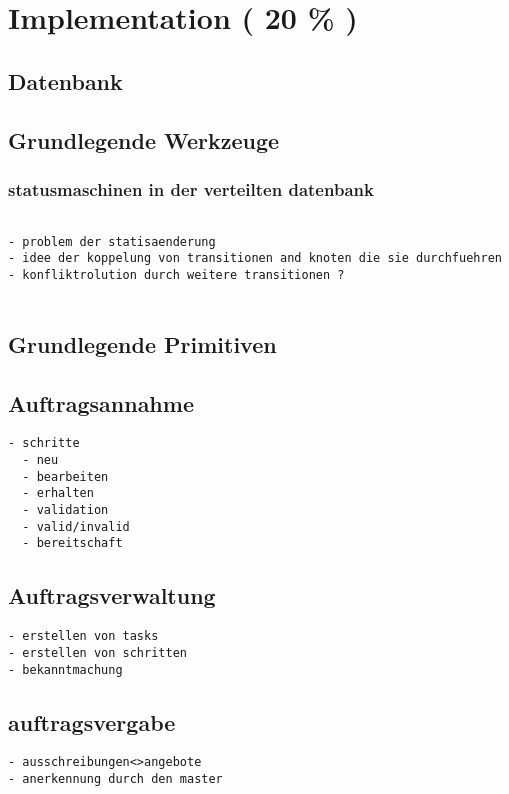 \chapter{Implementation ( 20 \% ) }
\section{Datenbank}
\section{Grundlegende Werkzeuge}
\subsection{statusmaschinen in der verteilten datenbank}

\begin{verbatim}

- problem der statisaenderung
- idee der koppelung von transitionen and knoten die sie durchfuehren
- konfliktrolution durch weitere transitionen ?


\end{verbatim}
\section{Grundlegende Primitiven}
\section{Auftragsannahme}

\begin{verbatim}
- schritte
  - neu
  - bearbeiten
  - erhalten
  - validation
  - valid/invalid
  - bereitschaft
\end{verbatim}

\section{Auftragsverwaltung}

\begin{verbatim}
- erstellen von tasks
- erstellen von schritten
- bekanntmachung
\end{verbatim}

\section{auftragsvergabe}

\begin{verbatim}
- ausschreibungen<>angebote
- anerkennung durch den master

\end{verbatim}

